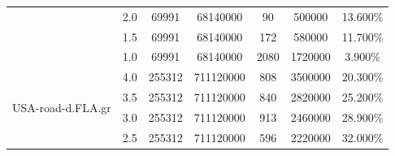 \begin{table}[H]
\begin{adjustbox}{max width=\textwidth}
\begin{tabular}{|c|c|c|c|c|c|c|}
                                   & 2.0                                     & 69991                                & 68140000                                     & 90                                     & 500000                                         & 13.600\%                                                       \\ \cline{2-7} 
                                   & 1.5                                     & 69991                                & 68140000                                     & 172                                    & 580000                                         & 11.700\%                                                       \\ \cline{2-7} 
                                   & 1.0                                     & 69991                                & 68140000                                     & 2080                                   & 1720000                                        & 3.900\%                                                        \\ \hline
\multirow{7}{*}{USA-road-d.FLA.gr} & 4.0                                     & 255312                               & 711120000                                    & 808                                    & 3500000                                        & 20.300\%                                                       \\ \cline{2-7} 
                                   & 3.5                                     & 255312                               & 711120000                                    & 840                                    & 2820000                                        & 25.200\%                                                       \\ \cline{2-7} 
                                   & 3.0                                     & 255312                               & 711120000                                    & 913                                    & 2460000                                        & 28.900\%                                                       \\ \cline{2-7} 
                                   & 2.5                                     & 255312                               & 711120000                                    & 596                                    & 2220000                                        & 32.000\%                                                       \\ \cline{2-7} 

\end{tabular}
\end{adjustbox}
\end{table}
